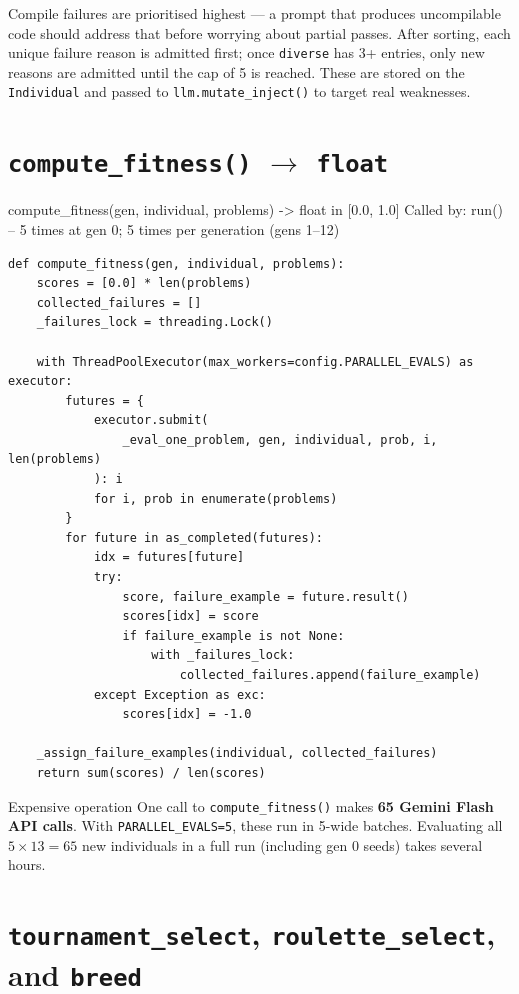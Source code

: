 \documentclass[11pt,a4paper]{report}
\newcommand{\fn}[1]{\texttt{#1}}
\begin{document}
Compile failures are prioritised highest --- a prompt that produces uncompilable
code should address that before worrying about partial passes.  After sorting,
each unique failure reason is admitted first; once \fn{diverse} has 3+ entries,
only new reasons are admitted until the cap of 5 is reached.  These are stored
on the \fn{Individual} and passed to \fn{llm.mutate\_inject()} to target real
weaknesses.

\section{\fn{compute\_fitness()} $\to$ \fn{float}}

\begin{spec}{compute\_fitness(gen, individual, problems) -> float in [0.0, 1.0]}
Called by: run() -- 5 times at gen 0; 5 times per generation (gens 1--12)
\end{spec}

\begin{lstlisting}[style=py]
def compute_fitness(gen, individual, problems):
    scores = [0.0] * len(problems)
    collected_failures = []
    _failures_lock = threading.Lock()

    with ThreadPoolExecutor(max_workers=config.PARALLEL_EVALS) as executor:
        futures = {
            executor.submit(
                _eval_one_problem, gen, individual, prob, i, len(problems)
            ): i
            for i, prob in enumerate(problems)
        }
        for future in as_completed(futures):
            idx = futures[future]
            try:
                score, failure_example = future.result()
                scores[idx] = score
                if failure_example is not None:
                    with _failures_lock:
                        collected_failures.append(failure_example)
            except Exception as exc:
                scores[idx] = -1.0

    _assign_failure_examples(individual, collected_failures)
    return sum(scores) / len(scores)
\end{lstlisting}

\begin{warn}{Expensive operation}
One call to \fn{compute\_fitness()} makes \textbf{65 Gemini Flash API calls}.
With \fn{PARALLEL\_EVALS=5}, these run in 5-wide batches.  Evaluating all
$5 \times 13 = 65$ new individuals in a full run (including gen 0 seeds) takes
several hours.
\end{warn}

\section{\fn{tournament\_select}, \fn{roulette\_select}, and \fn{breed}}
\end{document}
